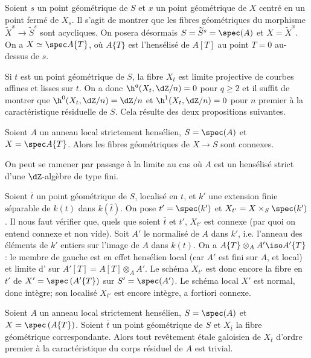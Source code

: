 Soient $s$ un point géométrique de $S$ et $x$ un point géométrique de 
$X$ centré en un point fermé de $X_s$. Il s'agit de montrer que les fibres 
géométriques du morphisme $\widetilde X^x\to \widetilde S^s$ sont 
acycliques. On posera désormais $S=\widetilde S^s=\spec(A)$ et 
$X=\widetilde X^x$. On a $X\simeq \spec A\{T\}$, où $A\{T\}$ est l'hensélisé 
de $A[T]$ au point $T=0$ au-dessus de $s$. 

Si $t$ est un point géométrique de $S$, la fibre $X_t$ est limite 
projective de courbes affines et lisses sur $t$. On a donc $\h^q(X_t,\dZ/n) = 0$ 
pour $q\geqslant 2$ et il suffit de montrer que $\h^0(X_t,\dZ/n) = \dZ/n$ et 
$\h^1(X_t,\dZ/n) = 0$ pour $n$ premier à la caractéristique résiduelle de 
$S$. Cela résulte des deux propositions suivantes. 





\begin{propositiondotdash}\label{I:5-2-2}
Soient $A$ un anneau local strictement hensélien, $S=\spec(A)$ et 
$X=\spec A\{T\}$. Alors les fibres géométriques de $X\to S$ sont connexes. 
\end{propositiondotdash}

On peut se ramener par passage à la limite au cas où $A$ est un hensélisé 
strict d'une $\dZ$-algèbre de type fini. 

Soient $\bar t$ un point géométrique de $S$, localisé en $t$, et $k'$ une 
extension finie séparable de $k(t)$ dans $k(\bar t)$. On pose $t'=\spec(k')$ 
et $X_{t'} = X\times_S\spec(k')$. Il nous faut vérifier que, quels que soient 
$\bar t$ et $t'$, $X_{t'}$ est connexe (par quoi on entend connexe et non vide). 
Soit $A'$ le normalisé de $A$ dans $k'$, i.e. l'anneau des éléments de 
$k'$ entiers sur l'image de $A$ dans $k(t)$. On a 
$A\{T\}\otimes_A A'\iso A'\{T\}$: le membre de gauche est en effet hensélien 
local (car $A'$ est fini sur $A$, et local) et limite d' sur $A'[T]=A[T]\otimes_A A'$. Le schéma $X_{t'}$ est donc encore 
la fibre en $t'$ de $X'=\spec\left(A'\{T\}\right)$ sur $S'=\spec(A')$. Le 
schéma local $X'$ est normal, donc intègre; son localisé $X_{t'}$ est 
encore intègre, a fortiori connexe. 





\begin{propositiondotdash}\label{I:5-2-3}
Soient $A$ un anneau local strictement hensélien, $S=\spec(A)$ et 
$X=\spec\left(A\{T\}\right)$. Soient $\bar t$ un point géométrique de $S$ 
et $X_{\bar t}$ la fibre géométrique correspondante. Alors tout revêtement 
étale galoisien de $X_{\bar t}$ d'ordre premier à la caractéristique du 
corps résiduel de $A$ est trivial. 
\end{propositiondotdash}





